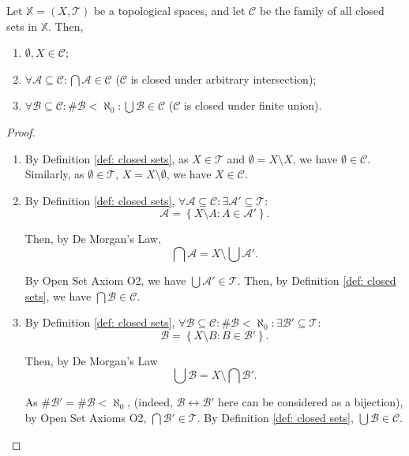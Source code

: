 \begin{lemma}
	\label{lm: closed sets axioms}
	
	Let $\mathbb X = (X, \mathcal T)$ be a topological spaces, and let $\mathcal C$ be the family of all closed sets in $\mathbb X$. Then,
	\begin{enumerate}[C1.]
		\item $\emptyset, X \in \mathcal C$;
		\item $\forall \mathcal A \subseteq \mathcal C: \bigcap \mathcal A \in \mathcal C$ ($\mathcal C$ is closed under arbitrary intersection);
		\item $\forall \mathcal B \subseteq \mathcal C: \# \mathcal B < \aleph_0: \bigcup \mathcal B \in \mathcal C$ ($\mathcal C$ is closed under finite union).
	\end{enumerate}
	
	\begin{proof}		
		\begin{enumerate}[C1.]
			\item
			By Definition \ref{def: closed sets}, as $X \in \mathcal T$ and $\emptyset = X \setminus X$, we have $\emptyset \in \mathcal C$. Similarly, as $\emptyset \in \mathcal T$, $X = X \setminus \emptyset$, we have $X \in \mathcal C$.
				\qedlm
				
			\item
			By Definition \ref{def: closed sets}, $\forall \mathcal A \subseteq \mathcal C: \exists \mathcal A' \subseteq \mathcal T:$
			$$
			\mathcal A = \left\{ X \setminus A : A \in \mathcal A' \right\}.
			$$
	
			Then, by De Morgan's Law,
			$$
			\bigcap \mathcal A = X \setminus \bigcup \mathcal A'.
			$$
			
			By Open Set Axiom O2, we have $\bigcup \mathcal A' \in \mathcal T$. Then, by Definition \ref{def: closed sets}, we have $\bigcap \mathcal B \in \mathcal C$.
			\qedlm
			
			\item
			By Definition \ref{def: closed sets}, $\forall \mathcal B \subseteq \mathcal C: \#\mathcal B < \aleph_0: \exists \mathcal B' \subseteq \mathcal T:$
			$$
			\mathcal B = \left\{ X \setminus B : B \in \mathcal B' \right\}.
			$$
			
			Then, by De Morgan's Law
			$$
			\bigcup \mathcal B = X \setminus \bigcap \mathcal B'.
			$$
			
			As $\# \mathcal B' = \# \mathcal B < \aleph_0$, (indeed, $\mathcal B \leftrightarrow \mathcal B'$ here can be considered as a bijection), by Open Set Axioms O2, $\bigcap \mathcal B' \in \mathcal T$. By Definition \ref{def: closed sets}, $\bigcup \mathcal B \in \mathcal C$.
		\end{enumerate}
	\end{proof}
\end{lemma}


